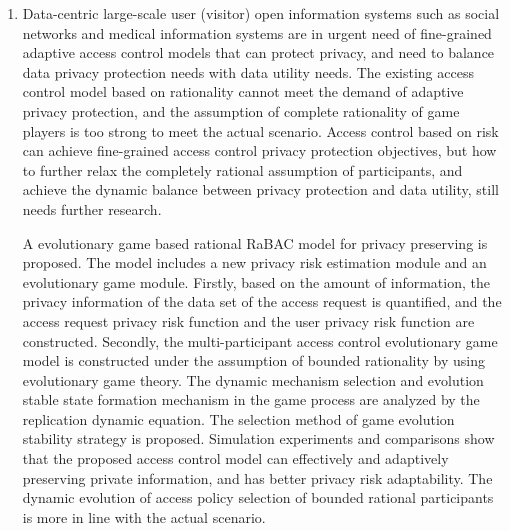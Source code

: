 \documentclass[pdftex,notypeinfo,twoside,openany,UTF8,fntef]{CASthesis}
\theoremstyle{THrm}{
	\newtheorem{question}{Question}[section]
	\newtheorem{property}{性质}[section]
	\newtheorem{assumption}{假设}[section]
	\newtheorem{claim}[lemma]{断言}
	
}
\begin{document}
\begin{enumerate}
	\item
	Data-centric large-scale user (visitor) open information systems such as social networks and medical information systems are in urgent need of fine-grained adaptive access control models that can protect privacy, and need to balance data privacy protection needs with data utility needs. The existing access control model based on rationality cannot meet the demand of adaptive privacy protection, and the assumption of complete rationality of game players is too strong to meet the actual scenario. Access control based on risk can achieve fine-grained access control privacy protection objectives, but how to further relax the completely rational assumption of participants, and achieve the dynamic balance between privacy protection and data utility, still needs further research.
	
	A evolutionary game based rational RaBAC model for privacy preserving is proposed. The model includes a new privacy risk estimation module and an evolutionary game module. Firstly, based on the amount of information, the privacy information of the data set of the access request is quantified, and the access request privacy risk function and the user privacy risk function are constructed. Secondly, the multi-participant access control evolutionary game model is constructed under the assumption of bounded rationality by using evolutionary game theory. The dynamic mechanism selection and evolution stable state formation mechanism in the game process are analyzed by the replication dynamic equation. The selection method of game evolution stability strategy is proposed. Simulation experiments and comparisons show that the proposed access control model can effectively and adaptively preserving private information, and has better privacy risk adaptability. The dynamic evolution of access policy selection of bounded rational participants is more in line with the actual scenario.
\end{enumerate}
\end{document}
